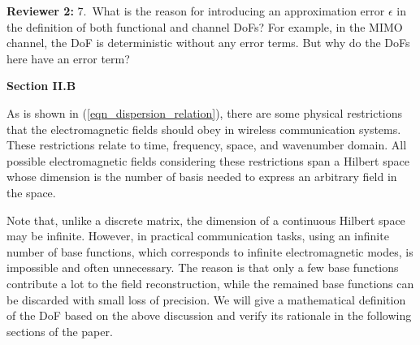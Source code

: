 \documentclass[a4paper,12pt]{article}
\begin{document}
 \textbf{Reviewer 2:}
7. What is the reason for introducing an approximation error $\epsilon$ in the definition of both functional and channel DoFs? For example, in the MIMO channel, the DoF is deterministic without any error terms. But why do the DoFs here have an error term?

 
 
 {}
 
 \begin{framed}
 	{\bf Section II.B}
 	
 	{\color{red}
 	\quad As is shown in (\ref{eqn_dispersion_relation}), there are some physical restrictions that the electromagnetic fields should obey in wireless communication systems. These restrictions relate to time, frequency, space, and wavenumber domain. All possible electromagnetic fields considering these restrictions span a Hilbert space whose dimension is the number of basis needed to express an arbitrary field in the space. 
 	
 	\quad Note that, unlike a discrete matrix, the dimension of a continuous Hilbert space may be infinite. However, in practical communication tasks, using an infinite number of base functions, which corresponds to infinite electromagnetic modes, is impossible and often unnecessary. The reason is that only a few base functions contribute a lot to the field reconstruction, while the remained base functions can be discarded with small loss of precision. We will give a mathematical definition of the DoF based on the above discussion and verify its rationale in the following sections of the paper. 
 	}
 	\end{framed}
\end{document}
